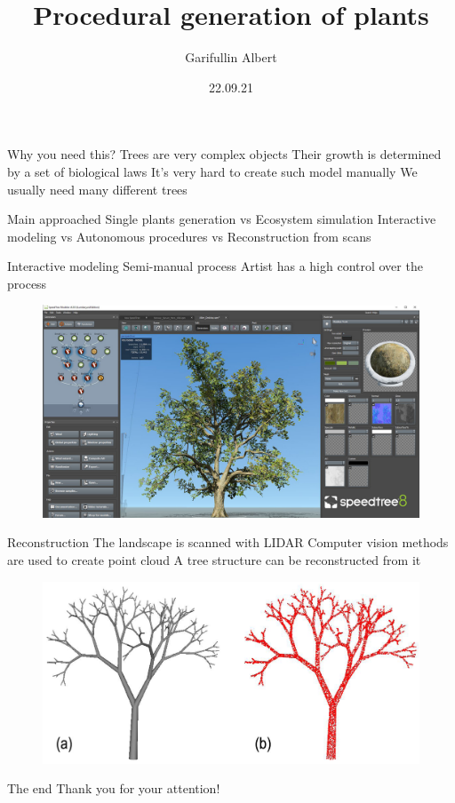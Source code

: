 \documentclass[14pt]{beamer}
\author{Garifullin Albert}
\title{Procedural generation of plants}
\date{22.09.21}
\begin{document}
\begin{frame}
\titlepage
\end{frame}

  
\begin{frame}{Why you need this?}
Trees are very complex objects\linebreak
Their growth is determined by a set of biological laws\linebreak
It's very hard to create such model manually\linebreak
We usually need many different trees
\end{frame}

\begin{frame}{Main approached}
Single plants generation vs Ecosystem simulation\linebreak
Interactive modeling vs Autonomous procedures vs
Reconstruction from scans
\end{frame}

\begin{frame}{Interactive modeling}
Semi-manual process\linebreak
Artist has a high control over the process
\begin{figure}[hbtp]
\includegraphics[scale=0.25]{speed_tree.jpg}
\end{figure}
\end{frame}

\begin{frame}{Reconstruction}
The landscape is scanned with LIDAR
Computer vision methods are used to create point cloud
A tree structure can be reconstructed from it
\begin{figure}[hbtp]
\includegraphics[scale=0.55]{recon.png}
\end{figure}
\end{frame}

\begin{frame}{The end}
Thank you for your attention!
\end{frame}
\end{document}
